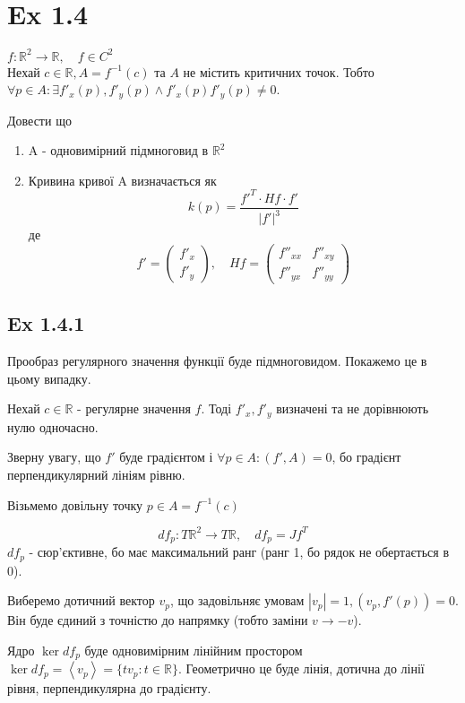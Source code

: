 \documentclass[10pt, a4paper]{article} %
\newcommand{\R}{\mathbb{R}}
\begin{document}
\section*{Ex 1.4}
\begin{mdframed}
    $f : \R^2 \to \R, \quad f\in C^2$\\
    Нехай $c\in \R, A = f^{-1}(c)$ та $A$ не містить критичних точок.
    Тобто $\forall p\in A: \exists f'_x(p), f'_y(p) \land f'_x(p)f'_y(p) \ne 0$.

    Довести що 
    \begin{enumerate}
        \item A - одновимірний підмноговид в $\R^2$
        \item Кривина кривої A визначається як
        \[k(p) = \frac{f'^T \cdot Hf \cdot f'}{|f'|^3}\]
        де
        \[f' = \begin{pmatrix}
            f'_x \\ f'_y
        \end{pmatrix}, \quad Hf = \begin{pmatrix}
            f''_{xx} & f''_{xy}\\ f''_{yx} & f''_{yy}
        \end{pmatrix}\]
    \end{enumerate}
\end{mdframed}

\subsection*{Ex 1.4.1}
Прообраз регулярного значення функції буде підмноговидом.
Покажемо це в цьому випадку.

Нехай $c\in \R$ - регулярне значення $f$.
Тоді $f'_x, f'_y$ визначені та не дорівнюють нулю одночасно.

Зверну увагу, що $f'$ буде градієнтом і $\forall p \in A: (f', A) = 0$, 
бо градієнт перпендикулярний лініям рівню.

Візьмемо довільну точку $p \in A = f^{-1}(c)$

\[df_p : T\R^2 \to T\R, \quad df_p = Jf^T\]
$df_p$ - сюр'єктивне, бо має максимальний ранг (ранг 1, бо рядок не обертається в 0).

Виберемо дотичний вектор $v_p$, що задовільняє умовам $|v_p|=1, (v_p,f'(p))=0$. 
Він буде єдиний з точністю до напрямку (тобто заміни $v \to -v$).

Ядро $\ker df_p$ буде одновимірним лінійним простором 
$\ker df_p = \left<v_p\right>=\{tv_p : t\in\R\}$. 
Геометрично це буде лінія, дотична до лінії рівня, перпендикулярна до градієнту.
\end{document}
